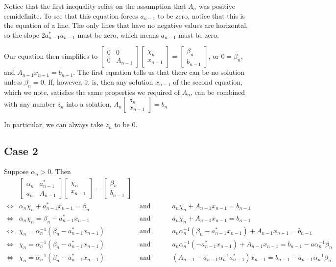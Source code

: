 \documentclass{article}
\newcommand{\bmat}[1]{\begin{bmatrix}#1\end{bmatrix}}
\begin{document}
Notice that the first inequality relies on the assumption that $A_n$ was
positive semidefinite. To see that this equation forces $a_{n-1}$ to be zero,
notice that this is the equation of a line. The only lines that have no negative
values are horizontal, so the slope $2a_{n-1}^*a_{n-1}$ must be zero, which means $a_{n-1}$ must
be zero.

Our equation then simplifies to 
$
\bmat{0 & 0 \\ 0 & A_{n-1}}\bmat{\chi_n\\x_{n-1}} =\bmat{\beta_n\\b_{n-1}}
$, or $0=\beta_n$, and
$A_{n-1}x_{n-1}=b_{n-1} $. The first equation tells us that there can be no solution unless
$\beta_n=0$. If, however, it is, then any solution $x_{n-1}$ of the
second equation, which we note, satisfies the same properties we required of 
$A_n$, can be combined with any number $z_n$ into a solution,
$A_n\bmat{z_n\\x_{n-1}} = b_n$

In particular, we can always take $z_n$ to be 0.

\subsection{Case 2}
Suppose $\alpha_n>0$. Then
\begin{align*}
&\bmat{\alpha_n & a_{n-1}^* \\ a_n & A_{n-1}}\bmat{\chi_n\\x_{n-1}}=\bmat{\beta_n\\b_{n-1}}
\\\iff&
\alpha_n\chi_n + a_{n-1}^*x_{n-1} = \beta_n &\text{ and }\hspace{2em}&
a_n\chi_n + A_{n-1}x_{n-1} = b_{n-1}
\\\iff&
\alpha_n\chi_n= \beta_n - a_{n-1}^*x_{n-1}  &\text{ and }\hspace{2em}&
a_n\chi_n + A_{n-1}x_{n-1} = b_{n-1}
\\\iff&
\chi_n= \alpha_n^{-1}(\beta_n - a_{n-1}^*x_{n-1}) &\text{ and }\hspace{2em}&
a_n\alpha_n^{-1}(\beta_n - a_{n-1}^*x_{n-1}) + A_{n-1}x_{n-1} = b_{n-1}
\\\iff&
\chi_n= \alpha_n^{-1}(\beta_n - a_{n-1}^*x_{n-1}) &\text{ and }\hspace{2em}&
a_n\alpha_n^{-1}(- a_{n-1}^*x_{n-1}) + A_{n-1}x_{n-1} = b_{n-1}-a\alpha_n^{-1}\beta_n
\\\iff&
\chi_n= \alpha_n^{-1}(\beta_n - a_{n-1}^*x_{n-1}) &\text{ and }\hspace{2em}&
(A_{n-1} - a_{n-1}\alpha_n^{-1}a_{n-1}^*)x_{n-1} = b_{n-1}-a_{n-1}\alpha_n^{-1}\beta_n
\end{align*}
\end{document}
